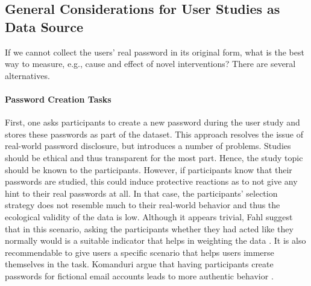 \subsection{General Considerations for User Studies as Data Source}
If we cannot collect the users' real password in its original form, what is the best way to measure, e.g., cause and effect of novel interventions? There are several alternatives. 
\paragraph{Password Creation Tasks} First, one asks participants to create a new password during the user study and stores these passwords as part of the dataset. This approach resolves the issue of real-world password disclosure, but introduces a number of problems.
Studies should be ethical and thus transparent for the most part. Hence, the study topic should be known to the participants. However, if participants know that their passwords are studied, this could induce protective reactions as to not give any hint to their real passwords at all. In that case, the participants' selection strategy does not resemble much to their real-world behavior and thus the ecological validity of the data is low. Although it appears trivial, Fahl \etal suggest that in this scenario, asking the participants whether they had acted like they normally would is a suitable indicator that helps in weighting the data \cite{Fahl2013EcologicalValidityPasswordStudy}. It is also recommendable to give users a specific scenario that helps users immerse themselves in the task. Komanduri \etal argue that having participants create passwords for fictional email accounts leads to more authentic behavior \cite{Komanduri2011OfPasswordsAndPeople}.
